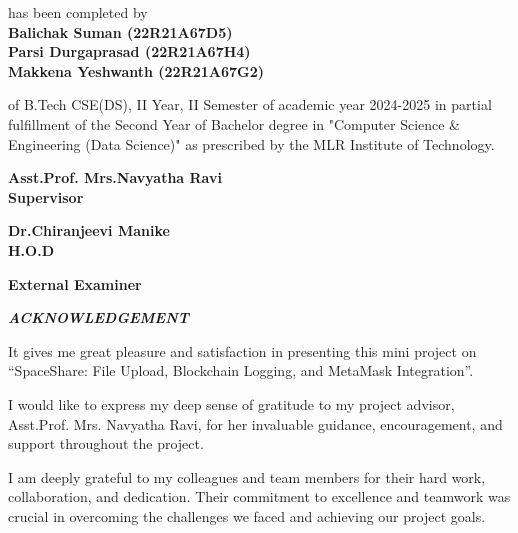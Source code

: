 \documentclass[a4paper, 12pt]{report}
\newenvironment{frontmatter}{}{}
\begin{document}
\begin{frontmatter}
\begin{titlepage}
\begin{center}
has been completed by \\
\textbf{Balichak Suman (22R21A67D5)}\\[0.1cm]
\textbf{Parsi Durgaprasad (22R21A67H4)}\\[0.1cm]
\textbf{Makkena Yeshwanth (22R21A67G2)}\\[0.1cm]
\end{center} 
\vspace{1cm}
of B.Tech CSE(DS), II Year, II Semester of academic year 2024-2025 in partial fulfillment of the Second Year of Bachelor degree in "Computer Science \& Engineering (Data Science)" as prescribed by the MLR Institute of Technology.
\vspace{2cm}
\begin{multicols}{2}
\begin{center}
\textbf{Asst.Prof. Mrs.Navyatha Ravi\\Supervisor}\hspace{5cm}\\
\end{center}
\begin{center}
\textbf{Dr.Chiranjeevi Manike\\H.O.D}\\
\end{center}
\vspace{0.5cm}
\end{multicols}
\vspace{2cm}
\begin{center}
    \textbf{External Examiner}
\end{center}
\vfill
\end{titlepage}
\newpage
\begin{center}
{\Large{\bf{\textit{ACKNOWLEDGEMENT}}\\[2cm]}}
\end{center}
\par It gives me great pleasure and satisfaction in presenting this mini project on “SpaceShare: File Upload, Blockchain Logging, and MetaMask Integration”.\\
\par I would like to express my deep sense of gratitude to my project advisor, Asst.Prof. Mrs. Navyatha Ravi, for her invaluable guidance, encouragement, and support throughout the project.\\
\par I am deeply grateful to my colleagues and team members for their hard work, collaboration, and dedication. Their commitment to excellence and teamwork was crucial in overcoming the challenges we faced and achieving our project goals.\\

\end{frontmatter}
\end{document}
